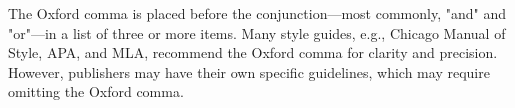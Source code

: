 


\noindent The Oxford comma is placed before the conjunction---most commonly, "and" and "or"---in a list of three or more items.
Many style guides, e.g., Chicago Manual of Style, APA, and MLA, recommend the Oxford comma for clarity and precision.
However, publishers may have their own specific guidelines, which may require omitting the Oxford comma.
